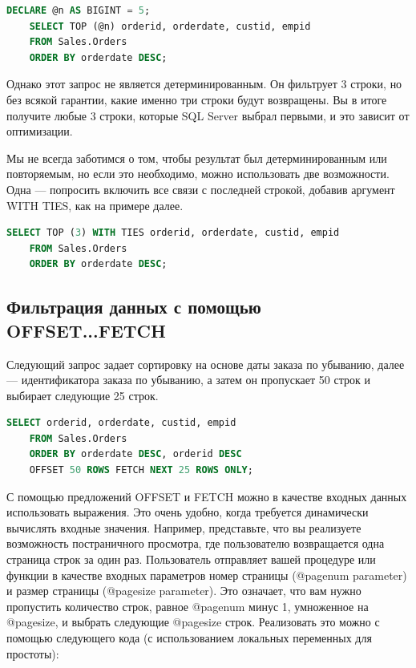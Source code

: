 \begin{lstlisting}[label=lst:funcReturn, language=sql]
	DECLARE @n AS BIGINT = 5;
	SELECT TOP (@n) orderid, orderdate, custid, empid
	FROM Sales.Orders
	ORDER BY orderdate DESC;
\end{lstlisting}

Однако этот запрос не является детерминированным. Он фильтрует 3 строки, но
без всякой гарантии, какие именно три строки будут возвращены. Вы в итоге получите любые 3 строки, которые SQL Server выбрал первыми, и это зависит от оптимизации. 

Мы не всегда заботимся о том, чтобы результат был детерминированным или
повторяемым, но если это необходимо, можно использовать две возможности. Одна — попросить включить все связи с последней строкой, добавив аргумент WITH
TIES, как на примере далее. 

\begin{lstlisting}[label=lst:funcReturn,  language=sql]
	SELECT TOP (3) WITH TIES orderid, orderdate, custid, empid
	FROM Sales.Orders
	ORDER BY orderdate DESC;
\end{lstlisting}

\subsection{Фильтрация данных с помощью OFFSET...FETCH}


Следующий запрос задает сортировку на основе даты заказа по убыванию, далее — идентификатора заказа по
убыванию, а затем он пропускает 50 строк и выбирает следующие 25 строк. 

\begin{lstlisting}[label=lst:funcReturn,  language=sql]
	SELECT orderid, orderdate, custid, empid
	FROM Sales.Orders
	ORDER BY orderdate DESC, orderid DESC
	OFFSET 50 ROWS FETCH NEXT 25 ROWS ONLY; 
\end{lstlisting}


С помощью предложений OFFSET и FETCH можно в качестве входных данных использовать выражения. Это очень удобно, когда требуется динамически вычислять
входные значения. Например, представьте, что вы реализуете возможность постраничного просмотра, где пользователю возвращается одна страница строк за один
раз. Пользователь отправляет вашей процедуре или функции в качестве входных
параметров номер страницы (@pagenum parameter) и размер страницы (@pagesize
parameter). Это означает, что вам нужно пропустить количество строк, равное
@pagenum минус 1, умноженное на @pagesize, и выбрать следующие @pagesize
строк. Реализовать это можно с помощью следующего кода (с использованием локальных переменных для простоты): 

